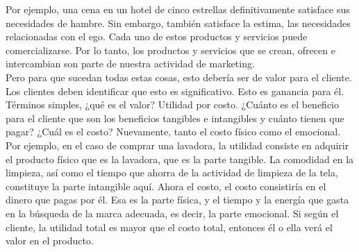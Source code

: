 \documentclass[10pt]{book}
\begin{document}
Por ejemplo, una cena en un hotel de cinco estrellas definitivamente satisface sus necesidades de hambre. Sin embargo, también satisface la estima, las necesidades relacionadas con el ego. Cada uno de estos productos y servicios puede comercializarse. Por lo tanto, los productos y servicios que se crean, ofrecen e intercambian son parte de nuestra actividad de marketing.\\
Pero para que sucedan todas estas cosas, esto debería ser de valor para el cliente. Los clientes deben identificar que esto es significativo. Esto es ganancia para él. Términos simples, ¿qué es el valor? Utilidad por costo. ¿Cuánto es el beneficio para el cliente que son los beneficios tangibles e intangibles y cuánto tienen que pagar? ¿Cuál es el costo? Nuevamente, tanto el costo físico como el emocional.\\
{\color{blue}Por ejemplo, en el caso de comprar una lavadora, la utilidad consiste en adquirir el producto físico que es la lavadora, que es la parte tangible. La comodidad en la limpieza, así como el tiempo que ahorra de la actividad de limpieza de la tela, constituye la parte intangible aquí. Ahora el costo, el costo consistiría en el dinero que pagas por él. Esa es la parte física, y el tiempo y la energía que gasta en la búsqueda de la marca adecuada, es decir, la parte emocional. Si según el cliente, la utilidad total es mayor que el costo total, entonces él o ella verá el valor en el producto.}
\end{document}
